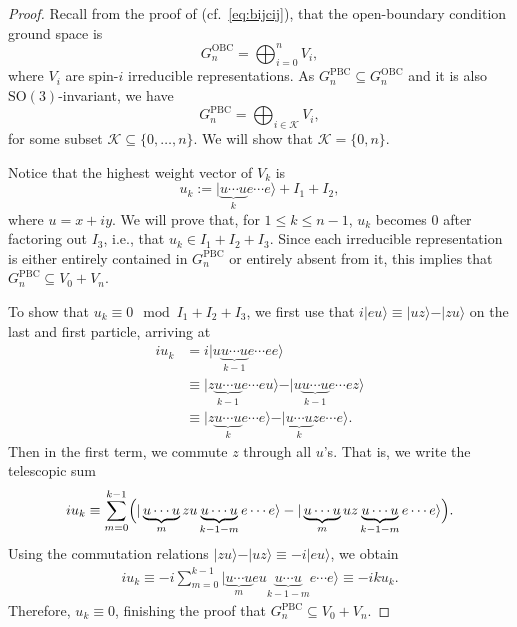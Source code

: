 \documentclass[a4paper]{article}
\newcommand{\ket}[1]{\vert #1 \rangle}
\newcommand{\SO}{\mathrm{SO}}
\theoremstyle{definition}
\begin{document}
\begin{proof}
    Recall from the proof of  (cf.\ \cref{eq:bijcij}), that the open-boundary condition ground space is
    \begin{equation*}
        G_{n}^{\mathrm{OBC}} = \bigoplus_{i=0}^n V_i,
    \end{equation*}
    where $V_i$ are spin-$i$ irreducible representations. As $G_{n}^{\mathrm{PBC}} \subseteq G_{n}^{\mathrm{OBC}}$ and it is also $\SO(3)$-invariant, we have
    \begin{equation*}
        G_{n}^{\mathrm{PBC}} = \bigoplus_{i\in \mathcal{K}} V_i,
    \end{equation*}
    for some subset $\mathcal{K} \subseteq \{0,\dots, n\}$. We will show that $\mathcal{K} = \{0,n\}$. 

    Notice that the highest weight vector of $V_k$ is
    \begin{equation*}
        u_k := \ket{\underbrace{u\cdots u}_k e \cdots e } + I_1 + I_2,
    \end{equation*}
    where $u = x+ i y$.
    We will prove that, for $1 \le k\le n-1$, $u_k$ becomes $0$ after factoring out $I_3$, i.e., that $u_k\in I_1 + I_2 + I_3$. Since each irreducible representation is either entirely contained in $G_{n}^{\mathrm{PBC}}$ or entirely absent from it, this implies that $G_{n}^{\mathrm{PBC}} \subseteq V_0 + V_n$. 

    To show that $u_k \equiv 0 \mod {I_1 + I_2 + I_3}$, we first  use that $i\ket{eu} \equiv \ket{uz}-\ket{zu}$ on the last and first particle, arriving at
    \begin{align*}
        i u_{k} &= i \ket{u\underbrace{u \cdots u}_{k-1} e\cdots ee} \\ 
        &\equiv \ket{z\underbrace{u \cdots u}_{k-1} e\cdots eu} - \ket{u\underbrace{u \cdots u}_{k-1} e\cdots ez} \\
        &\equiv \ket{z\underbrace{u \cdots u}_{k} e\cdots e} - \ket{\underbrace{u \cdots u}_{k} ze\cdots e} .       
    \end{align*}
    Then in the first term, we commute $z$ through all $u$'s. That is, we write the telescopic sum
    \begin{align*}
        i u_{k} \equiv \sum_{m=0}^{k-1} \Bigl(\ket{\underbrace{u \cdots u}_{m} zu \underbrace{u \cdots u}_{k-1-m} e\cdots e} - \ket{\underbrace{u \cdots u}_{m} uz\underbrace{u \cdots u}_{k-1-m} e\cdots e} \Bigr).    
    \end{align*}
    Using the commutation relations $\ket{zu}-\ket{uz} \equiv -i\ket{eu}$, we obtain
    \begin{align*}
        i u_{k} \equiv -i\sum_{m=0}^{k-1} \ket{\underbrace{u \cdots u}_{m} eu \underbrace{u \cdots u}_{k-1-m} e\cdots e}
        \equiv -ik u_k.
    \end{align*}
    Therefore, $u_{k} \equiv 0$, finishing the proof that $G_{n}^{\mathrm{PBC}} \subseteq V_0 + V_n$.


\end{proof}
\end{document}
